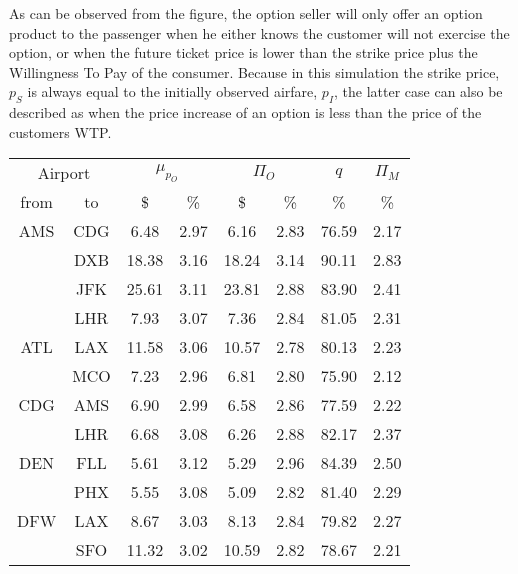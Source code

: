  
As can be observed from the figure, the option seller will only offer an option product to the passenger when he either knows the customer will not exercise the option, or when the future ticket price is lower than the strike price plus the Willingness To Pay of the consumer. Because in this simulation the strike price, $p_S$ is always equal to the initially observed airfare, $p_I$, the latter case can also be described as when the price increase of an option is less than the price of the customers WTP.




\begin{table}
\begin{center}
\begin{tabular}{c c | c c | c c | c | c }
\toprule
\multicolumn{2}{c|}{Airport}  &  \multicolumn{2}{c|}{$\mu_{p_O}$} & \multicolumn{2}{c|}{$\Pi_O$}  &  $q$  & $\Pi_M$ \\[.4ex]
from  &  to  &  \$  & \%  &  \$  & \%  & \%  & \% \\
    \midrule
AMS  &  CDG  &    6.48  &  2.97  &    6.16  &  2.83  &  76.59  &  2.17 \\
~    &  DXB  &   18.38  &  3.16  &   18.24  &  3.14  &  90.11  &  2.83 \\
~    &  JFK  &   25.61  &  3.11  &   23.81  &  2.88  &  83.90  &  2.41 \\
~    &  LHR  &    7.93  &  3.07  &    7.36  &  2.84  &  81.05  &  2.31 \\[.5ex]
ATL  &  LAX  &   11.58  &  3.06  &   10.57  &  2.78  &  80.13  &  2.23 \\
~    &  MCO  &    7.23  &  2.96  &    6.81  &  2.80  &  75.90  &  2.12 \\[.5ex]
CDG  &  AMS  &    6.90  &  2.99  &    6.58  &  2.86  &  77.59  &  2.22 \\
~    &  LHR  &    6.68  &  3.08  &    6.26  &  2.88  &  82.17  &  2.37 \\[.5ex]
DEN  &  FLL  &    5.61  &  3.12  &    5.29  &  2.96  &  84.39  &  2.50 \\
~    &  PHX  &    5.55  &  3.08  &    5.09  &  2.82  &  81.40  &  2.29 \\[.5ex]
DFW  &  LAX  &    8.67  &  3.03  &    8.13  &  2.84  &  79.82  &  2.27 \\
~    &  SFO  &   11.32  &  3.02  &   10.59  &  2.82  &  78.67  &  2.21 \\[.5ex]

\end{tabular}
\end{center}
\end{table}
